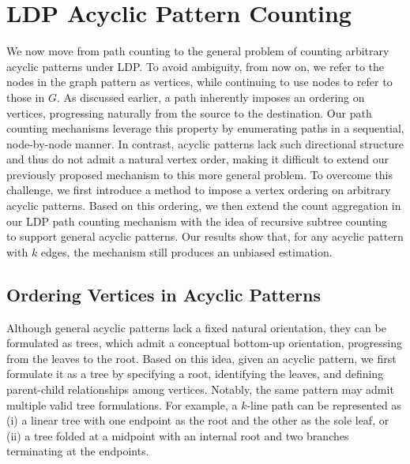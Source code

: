 \section{LDP Acyclic Pattern Counting}
\label{sec:pattern}


We now move from path counting to the general problem of counting arbitrary acyclic patterns under LDP. 
To avoid ambiguity, from now on, we refer to the nodes in the graph pattern as vertices, while continuing to use nodes to refer to those in $G$.
As discussed earlier, a path inherently imposes an ordering on vertices, progressing naturally from the source to the destination. 
Our path counting mechanisms leverage this property by enumerating paths in a sequential, node-by-node manner. 
In contrast, acyclic patterns lack such directional structure and thus do not admit a natural vertex order, making it difficult to extend our previously proposed mechanism to this more general problem.
To overcome this challenge, we first introduce a method to impose a vertex ordering on arbitrary acyclic patterns. 
Based on this ordering, {we then extend the count aggregation in our LDP path counting mechanism with the idea of recursive subtree counting~\cite{yannakakis1981algorithms} to support general acyclic patterns.}
Our results show that, for any acyclic pattern with $k$ edges, the mechanism still produces an unbiased estimation.



\subsection{Ordering Vertices in Acyclic Patterns}
\label{subsec:preprocess}

Although general acyclic patterns lack a fixed natural orientation, they can be formulated as trees, which admit a conceptual bottom-up orientation, progressing from the leaves to the root.
Based on this idea, given an acyclic pattern, we first formulate it as a tree by specifying a root, identifying the leaves, and defining parent-child relationships among vertices.
Notably, the same pattern may admit multiple valid tree formulations. 
For example, a $k$-line path can be represented as (i) a linear tree with one endpoint as the root and the other as the sole leaf, or (ii) a tree folded at a midpoint with an internal root and two branches terminating at the endpoints.


